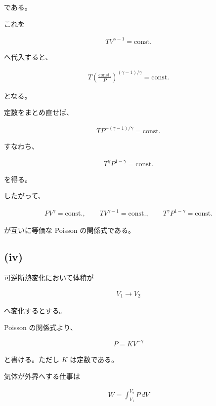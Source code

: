 \documentclass[platex,dvipdfmx,a4paper]{jsarticle}
\begin{document}
である。

これを

\begin{align*}
TV^{\gamma-1}
=
\mathrm{const.}
\end{align*}

へ代入すると、

\begin{align*}
T
\left(
\frac{\mathrm{const.}}{P}
\right)^{(\gamma-1)/\gamma}
=
\mathrm{const.}
\end{align*}

となる。

定数をまとめ直せば、

\begin{align*}
TP^{-(\gamma-1)/\gamma}
=
\mathrm{const.}
\end{align*}

すなわち、

\begin{align*}
T^\gamma P^{1-\gamma}
=
\mathrm{const.}
\end{align*}

を得る。

したがって、

\begin{align*}
PV^\gamma
=
\mathrm{const.},
\qquad
TV^{\gamma-1}
=
\mathrm{const.},
\qquad
T^\gamma P^{1-\gamma}
=
\mathrm{const.}
\end{align*}

が互いに等価な Poisson の関係式である。

\subsection{(iv)}

可逆断熱変化において体積が

\begin{align*}
V_1 \rightarrow V_2
\end{align*}

へ変化するとする。

Poisson の関係式より、

\begin{align*}
P
=
KV^{-\gamma}
\end{align*}

と書ける。ただし $K$ は定数である。

気体が外界へする仕事は

\begin{align*}
W
=
\int_{V_1}^{V_2} P\,dV
\end{align*}
\end{document}
